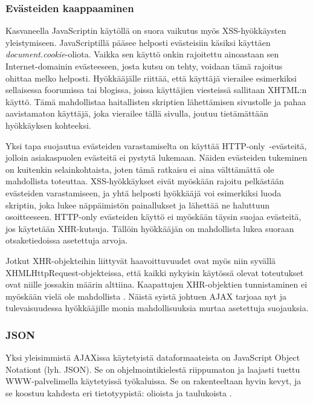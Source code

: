 \subsubsection{Evästeiden kaappaaminen}

Kasvaneella JavaScriptin käytöllä on suora vaikutus myös
XSS-hyök\-käys\-ten yleistymiseen. JavaScriptillä pääsee helposti
evästeisiin käsiksi käyttäen \emph{document.cookie}-oliota. Vaikka sen
käyttö onkin rajoitettu ainoastaan sen Internet-domainin evästeeseen,
josta kutsu on tehty, voidaan tämä rajoitus ohittaa melko
helposti. Hyökkääjälle riittää, että käyttäjä vierailee esimerkiksi
sellaisessa foorumissa tai blogissa, joissa käyttäjien viesteissä
sallitaan XHTML:n käyttö. Tämä mahdollistaa haitallisten skriptien
lähettämisen sivustolle ja pahaa aavistamaton käyttäjä, joka vierailee
tällä sivulla, joutuu tietämättään hyökkäyksen kohteeksi.

Yksi tapa suojautua evästeiden varastamiselta on käyttää
HTTP-only~-evästeitä, jolloin asiakaspuolen evästeitä ei pystytä
lukemaan. Näiden evästeiden tukeminen on kuitenkin selainkohtaista,
joten tämä ratkaisu ei aina välttämättä ole mahdollista
toteuttaa. XSS-hyök\-käyk\-set eivät myöskään rajoitu pelkästään
evästeiden varastamiseen, ja yhtä helposti hyökkääjä voi esimerkiksi
luoda skriptin, joka lukee näppäimistön painallukset ja lähettää ne
haluttuun osoitteeseen. HTTP-only evästeiden käyttö ei myöskään täysin
suojaa evästeitä, jos käytetään XHR-kutsuja. Tällöin hyökkääjän on
mahdollista lukea suoraan otsaketiedoissa asetettuja arvoja.

Jotkut XHR-objekteihin liittyvät haavoittuvuudet ovat myös niin
syvällä XHMLHttpRequest-objekteissa, että kaikki nykyisin käytössä
olevat toteutukset ovat niille jossakin määrin alttiina. Kaapattujen
XHR-objektien tunnistaminen ei myöskään vielä ole mahdollista
\cite{AJAX}. Näistä syistä johtuen AJAX tarjoaa nyt ja tulevaisuudessa
hyökkääjille monia mahdollisuuksia murtaa asetettuja suojauksia.

\subsubsection{JSON}

Yksi yleisimmistä AJAXissa käytetyistä dataformaateista on JavaScript
Object Notationt (lyh. JSON). Se on ohjelmointikielestä riippumaton ja
laajasti tuettu WWW-palvelimella käytetyissä työkaluissa. Se on
rakenteeltaan hyvin kevyt, ja se koostuu kahdesta eri tietotyypistä:
olioista ja taulukoista \cite{JSON}.

